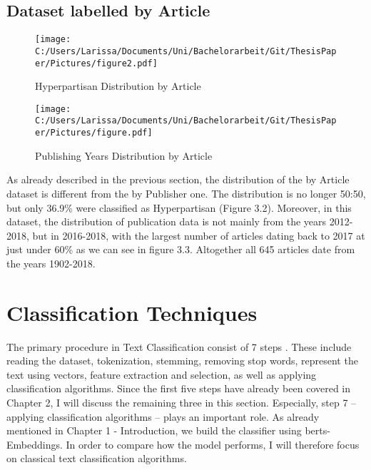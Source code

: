 \documentclass[a4paper, 11pt,titlepage,oneside,openany]{book}
\begin{document}
\newpage
\section{Dataset labelled by Article}
\begin{figure}[h]
	\begin{minipage}{.45\linewidth}
		\texttt{[image: C:/Users/Larissa/Documents/Uni/Bachelorarbeit/Git/ThesisPaper/Pictures/figure2.pdf]}
		\caption{Hyperpartisan Distribution by Article}
	\end{minipage}
	\hspace{.1\linewidth}%
	\begin{minipage}{.45\linewidth}
		\texttt{[image: C:/Users/Larissa/Documents/Uni/Bachelorarbeit/Git/ThesisPaper/Pictures/figure.pdf]}
		\caption{Publishing Years Distribution by Article}
	\end{minipage}
\end{figure}
As already described in the previous section, the distribution of the by Article dataset is different from the by Publisher one. The distribution is no longer 50:50, but only 36.9\% were classified as Hyperpartisan (Figure 3.2). 
\noindent Moreover, in this dataset, the distribution of publication data is not mainly from the years 2012-2018, but in 2016-2018, with the largest number of articles dating back to 2017 at just under 60\% as we can see in figure 3.3. Altogether all 645 articles date from the years 1902-2018.





\chapter{Classification Techniques}
The primary procedure in Text Classification consist of 7 steps \cite{textclassification}. These include  reading the dataset, tokenization, stemming, removing stop words, represent the text using vectors, feature extraction and selection, as well as applying classification algorithms. Since the first five steps have already been covered in Chapter 2, I will discuss the remaining three in this section. Especially, step 7 -- applying classification algorithms -- plays an important role. As already mentioned in Chapter 1 - Introduction, we build the classifier using \glspl{bert}-Embeddings. In order to compare how the model performs, I will therefore focus on classical text classification algorithms.
\end{document}
